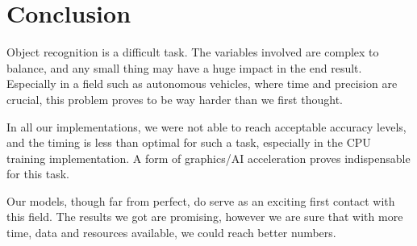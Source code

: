 \documentclass[conference]{IEEEtran}
\begin{document}
\section{Conclusion}
Object recognition is a difficult task. The variables involved are complex to balance, and any small thing may have a huge impact in the end result. Especially in a field such as autonomous vehicles, where time and precision are crucial, this problem proves to be way harder than we first thought.

In all our implementations, we were not able to reach acceptable accuracy levels, and the timing is less than optimal for such a task, especially in the CPU training implementation. A form of graphics/AI acceleration proves indispensable for this task.

Our models, though far from perfect, do serve as an exciting first contact with this field. The results we got are promising, however we are sure that with more time, data and resources available, we could reach better numbers.
\end{document}
